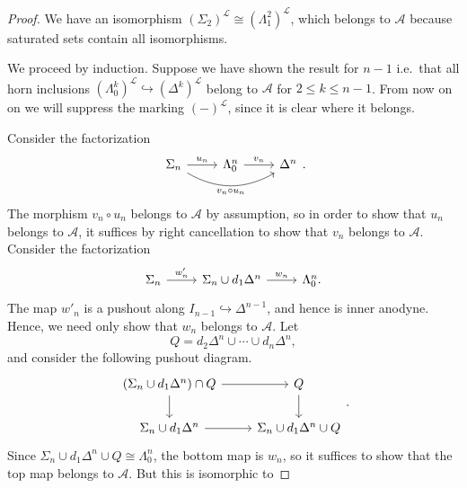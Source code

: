 \documentclass[main.tex]{subfiles}
\begin{document}
\begin{proof}
  We have an isomorphism $(\Sigma_{2})^{\mathcal{L}} \cong (\Lambda^{2}_{1})^{\mathcal{L}}$, which belongs to $\mathcal{A}$ because saturated sets contain all isomorphisms.

  We proceed by induction. Suppose we have shown the result for $n - 1$ i.e.\ that all horn inclusions $(\Lambda^{k}_{0})^{\mathcal{L}} \hookrightarrow (\Delta^{k})^{\mathcal{L}}$ belong to $\mathcal{A}$ for $2 \leq k \leq n-1$. From now on on we will suppress the marking $(-)^{\mathcal{L}}$, since it is clear where it belongs.

  Consider the factorization
  \begin{equation*}
    \begin{tikzcd}
      \Sigma_{n}
      \arrow[r, "u_{n}"]
      \arrow[rr, bend right, swap, "v_{n} \circ u_{n}"]
      & \Lambda^{n}_{0}
      \arrow[r, "v_{n}"]
      & \Delta^{n}
    \end{tikzcd}.
  \end{equation*}
  The morphism $v_{n} \circ u_{n}$ belongs to $\mathcal{A}$ by assumption, so in order to show that $u_{n}$ belongs to $\mathcal{A}$, it suffices by right cancellation to show that $v_{n}$ belongs to $\mathcal{A}$. Consider the factorization
  \begin{equation*}
    \begin{tikzcd}
      \Sigma_{n}
      \arrow[r, "w'_{n}"]
      & \Sigma_{n} \cup d_{1} \Delta^{n}
      \arrow[r, "w_{n}"]
      & \Lambda^{n}_{0}.
    \end{tikzcd}
  \end{equation*}
  The map $w'_{n}$ is a pushout along $I_{n-1} \hookrightarrow \Delta^{n-1}$, and hence is inner anodyne. Hence, we need only show that $w_{n}$ belongs to $\mathcal{A}$. Let 
  \begin{equation*}
    Q = d_{2} \Delta^{n} \cup \cdots \cup d_{n} \Delta^{n},
  \end{equation*}
  and consider the following pushout diagram.
  \begin{equation*}
    \begin{tikzcd}
      (\Sigma_{n} \cup d_{1}\Delta^{n}) \cap Q
      \arrow[r]
      \arrow[d]
      & Q
      \arrow[d]
      \\
      \Sigma_{n} \cup d_{1} \Delta^{n}
      \arrow[r]
      & \Sigma_{n} \cup d_{1}\Delta^{n} \cup Q
    \end{tikzcd}.
  \end{equation*}
  Since $\Sigma_{n} \cup d_{1} \Delta^{n} \cup Q \cong \Lambda^{n}_{0}$, the bottom map is $w_{n}$, so it suffices to show that the top map belongs to $\mathcal{A}$. But this is isomorphic to

\end{proof}
\end{document}
